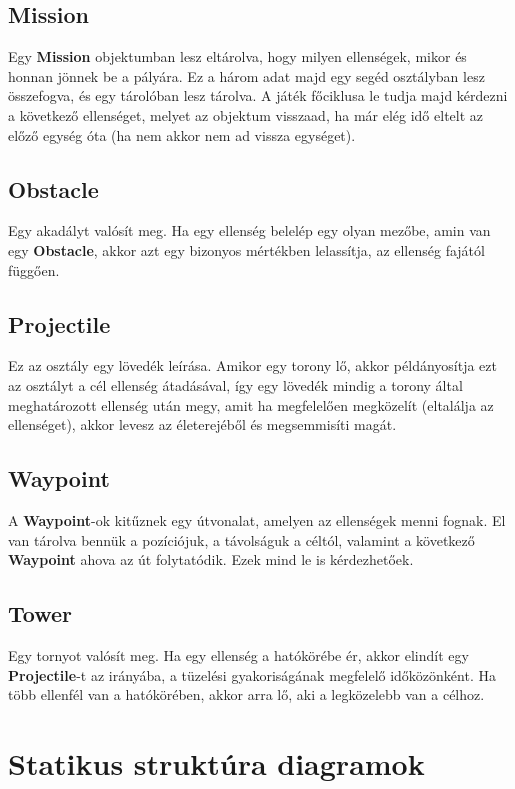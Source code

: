 \subsection{Mission}
Egy \textbf{Mission} objektumban lesz eltárolva, hogy milyen ellenségek, mikor és honnan jönnek be a pályára. Ez a három adat majd egy segéd osztályban lesz összefogva, és egy tárolóban lesz tárolva. A játék főciklusa le tudja majd kérdezni a következő ellenséget, melyet az objektum visszaad, ha már elég idő eltelt az előző egység óta (ha nem akkor nem ad vissza egységet).

\subsection{Obstacle}
Egy akadályt valósít meg. Ha egy ellenség belelép egy olyan mezőbe, amin van egy \textbf{Obstacle}, akkor azt egy bizonyos mértékben lelassítja, az ellenség fajától függően.

\subsection{Projectile}
Ez az osztály egy lövedék leírása. Amikor egy torony lő, akkor példányosítja ezt az osztályt a cél ellenség átadásával, így egy lövedék mindig a torony által meghatározott ellenség után megy, amit ha megfelelően megközelít (eltalálja az ellenséget), akkor levesz az életerejéből és megsemmisíti magát.

\subsection{Waypoint}
A \textbf{Waypoint}-ok kitűznek egy útvonalat, amelyen az ellenségek menni fognak. El van tárolva bennük a pozíciójuk, a távolságuk a céltól, valamint a következő \textbf{Waypoint} ahova az út folytatódik. Ezek mind le is kérdezhetőek.

\subsection{Tower}
Egy tornyot valósít meg. Ha egy ellenség a hatókörébe ér, akkor elindít egy \textbf{Projectile}-t az irányába, a tüzelési gyakoriságának megfelelő időközönként. Ha több ellenfél van a hatókörében, akkor arra lő, aki a legközelebb van a célhoz.


\section{Statikus struktúra diagramok}

